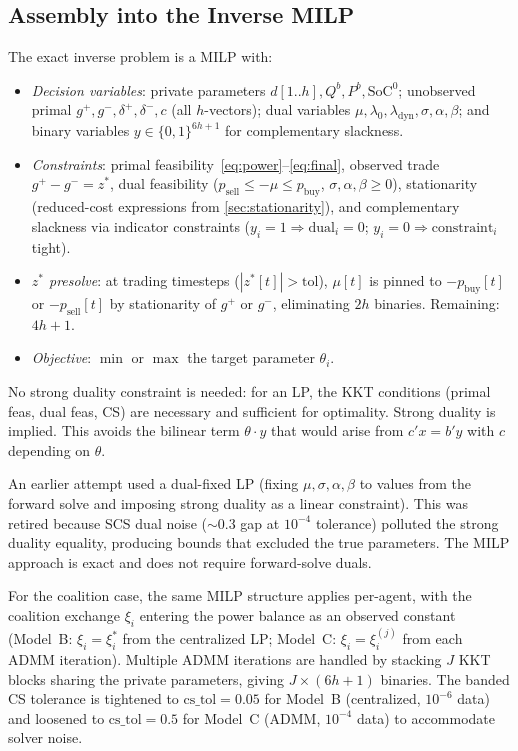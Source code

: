 \documentclass[11pt,a4paper]{article}
\newcommand{\pb}{p_{\text{buy}}}
\newcommand{\ps}{p_{\text{sell}}}
\newcommand{\netload}{d}
\newcommand{\Qb}{{Q^b}}
\newcommand{\Pb}{{P^b}}
\newcommand{\SoC}{{\text{SoC}^0}}
\newcommand{\ce}{\xi}
\begin{document}
\subsection{Assembly into the Inverse MILP}

The exact inverse problem is a MILP with:
\begin{itemize}[nosep]
    \item \emph{Decision variables}: private parameters $\netload[1..h], \Qb, \Pb, \SoC$; unobserved primal $g^+, g^-, \delta^+, \delta^-, c$ (all $h$-vectors); dual variables $\mu, \lambda_0, \lambda_{\text{dyn}}, \sigma, \alpha, \beta$; and binary variables $y \in \{0,1\}^{6h+1}$ for complementary slackness.
    \item \emph{Constraints}: primal feasibility~\eqref{eq:power}--\eqref{eq:final}, observed trade $g^+ - g^- = z^*$, dual feasibility ($\ps \leq -\mu \leq \pb$, $\sigma, \alpha, \beta \geq 0$), stationarity (reduced-cost expressions from \cref{sec:stationarity}), and complementary slackness via indicator constraints ($y_i = 1 \Rightarrow \text{dual}_i = 0$; $y_i = 0 \Rightarrow \text{constraint}_i$ tight).
    \item \emph{$z^*$ presolve}: at trading timesteps ($|z^*[t]| > \text{tol}$), $\mu[t]$ is pinned to $-\pb[t]$ or $-\ps[t]$ by stationarity of $g^+$ or $g^-$, eliminating $2h$ binaries. Remaining: $4h+1$.
    \item \emph{Objective}: $\min$ or $\max$ the target parameter $\theta_i$.
\end{itemize}

No strong duality constraint is needed: for an LP, the KKT conditions (primal feas, dual feas, CS) are necessary and sufficient for optimality. Strong duality is implied. This avoids the bilinear term $\theta \cdot y$ that would arise from $c'x = b'y$ with $c$ depending on $\theta$.

An earlier attempt used a dual-fixed LP (fixing $\mu, \sigma, \alpha, \beta$ to values from the forward solve and imposing strong duality as a linear constraint). This was retired because SCS dual noise ($\sim 0.3$ gap at $10^{-4}$ tolerance) polluted the strong duality equality, producing bounds that excluded the true parameters. The MILP approach is exact and does not require forward-solve duals.

For the coalition case, the same MILP structure applies per-agent, with the coalition exchange $\ce_i$ entering the power balance as an observed constant (Model~B: $\ce_i = \ce_i^*$ from the centralized LP; Model~C: $\ce_i = \ce_i^{(j)}$ from each ADMM iteration). Multiple ADMM iterations are handled by stacking $J$ KKT blocks sharing the private parameters, giving $J \times (6h+1)$ binaries. The banded CS tolerance is tightened to $\text{cs\_tol} = 0.05$ for Model~B (centralized, $10^{-6}$ data) and loosened to $\text{cs\_tol} = 0.5$ for Model~C (ADMM, $10^{-4}$ data) to accommodate solver noise.
\end{document}
